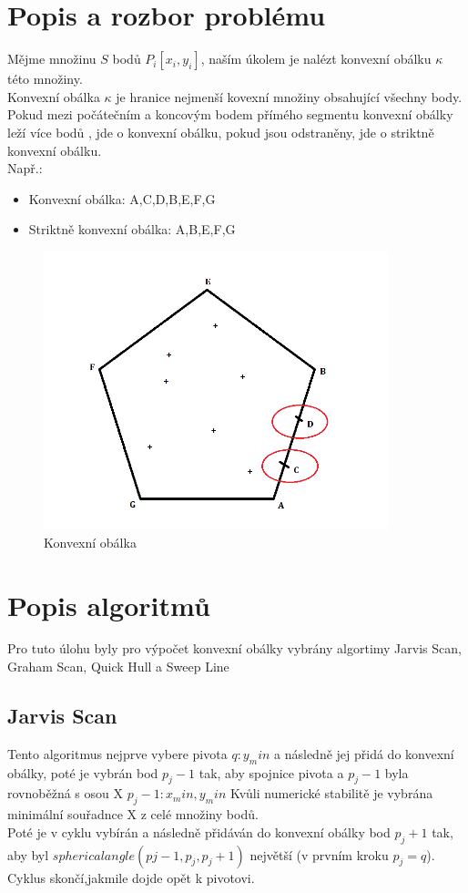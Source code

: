 \documentclass[a4paper, 12pt]{article}
\begin{document}
\clearpage

\section{Popis a rozbor problému}

Mějme množinu $S$ bodů $P_i [x_i, y_i]$, naším úkolem je nalézt konvexní obálku $\kappa$ této množiny.\\
  
Konvexní obálka $\kappa$ je hranice nejmenší kovexní množiny obsahující všechny body. \\
Pokud mezi počátečním a koncovým bodem přímého segmentu konvexní obálky leží více bodů , jde o konvexní obálku, pokud jsou odstraněny, jde o striktně konvexní obálku. \\
Např.:
\begin{itemize}
\item Konvexní obálka: A,C,D,B,E,F,G
\item Striktně konvexní obálka: A,B,E,F,G
\end{itemize}
\begin{figure}[h]
	\centering
	\includegraphics[width=10cm]{KO.png}
	\caption{Konvexní obálka}
\end{figure}


\clearpage
\section{Popis algoritmů}

Pro tuto úlohu byly pro výpočet konvexní obálky vybrány algortimy Jarvis Scan, Graham Scan, Quick Hull a Sweep Line\\

\subsection{Jarvis Scan}
Tento algoritmus nejprve vybere pivota $q: y_min$ a následně jej přidá do konvexní obálky, poté je vybrán bod $p_j-1$ tak, aby spojnice pivota a $p_j-1$ byla rovnoběžná s osou X $p_j-1: x_min, y_min$ Kvůli numerické stabilitě je vybrána minimální souřadnce X z celé množiny bodů. \\
Poté je v cyklu vybírán a následně přidáván do konvexní obálky bod $p_j+1$ tak, aby byl $sphericalangle (pj-1, p_j, p_j+1)$ největší (v prvním kroku $p_j = q$). Cyklus skončí,jakmile dojde opět k pivotovi.
\end{document}
